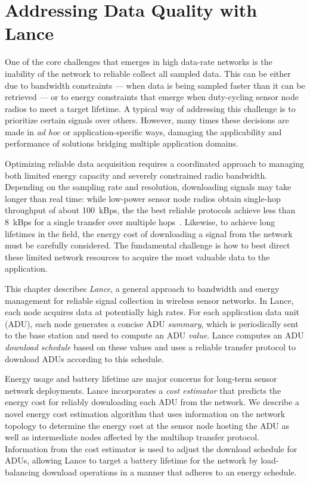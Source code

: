 \chapter{Addressing Data Quality with Lance}
\label{chapter-lance}

One of the core challenges that emerges in high data-rate networks is the
inability of the network to reliable collect all sampled data. This can be
either due to bandwidth constraints --- when data is being sampled faster
than it can be retrieved --- or to energy constraints that emerge when
duty-cycling sensor node radios to meet a target lifetime. A typical way of
addressing this challenge is to prioritize certain signals over others.
However, many times these decisions are made in \textit{ad hoc} or
application-specific ways, damaging the applicability and performance of
solutions bridging multiple application domains.

Optimizing reliable data acquisition requires a coordinated approach to
managing both limited energy capacity and severely constrained radio
bandwidth. Depending on the sampling rate and resolution, downloading signals
may take longer than real time: while low-power sensor node radios obtain
single-hop throughput of about 100~kBps, the the best reliable protocols
achieve less than 8~kBps for a single transfer over multiple
hops~\cite{flush-sensys07}. Likewise, to achieve long lifetimes in the field,
the energy cost of downloading a signal from the network must be carefully
considered. The fundamental challenge is how to best direct these limited
network resources to acquire the most valuable data to the application.

This chapter describes \textit{Lance}, a general approach to bandwidth and
energy management for reliable signal collection in wireless sensor networks.
In Lance, each node acquires data at potentially high rates. For each
application data unit (ADU), each node generates a concise ADU
\textit{summary}, which is periodically sent to the base station and used to
compute an ADU \textit{value}. Lance computes an ADU \textit{download
schedule} based on these values and uses a reliable transfer protocol to
download ADUs according to this schedule.

Energy usage and battery lifetime are major concerns for long-term sensor
network deployments. Lance incorporates a \textit{cost estimator} that
predicts the energy cost for reliably downloading each ADU from the network.
We describe a novel energy cost estimation algorithm that uses information on
the network topology to determine the energy cost at the sensor node hosting
the ADU as well as intermediate nodes affected by the multihop transfer
protocol. Information from the cost estimator is used to adjust the download
schedule for ADUs, allowing Lance to target a battery lifetime for the
network by load-balancing download operations in a manner that adheres to an
energy schedule.

